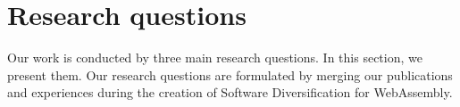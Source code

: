 













\section{Research questions}
\label{intro:definition:rq}

Our work is conducted by three main research questions.
In this section, we present them. 
Our research questions are formulated by merging our publications and experiences during the creation of Software Diversification for WebAssembly. 

